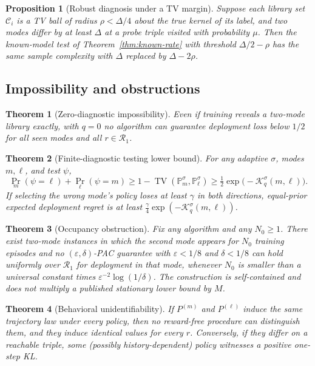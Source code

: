 \documentclass[11pt]{article}
\newtheorem{theorem}{Theorem}
\newtheorem{proposition}{Proposition}
\newcommand{\Rone}{\mathcal{R}_1}
\newcommand{\TV}{\operatorname{TV}}
\newcommand{\Prb}{\Pr}
\newcommand{\cC}{\mathcal{C}}
\newcommand{\eps}{\varepsilon}
\begin{document}
\begin{proposition}[Robust diagnosis under a TV margin]
\label{prop:robust}
Suppose each library set $\cC_i$ is a TV ball of radius $\rho<\Delta/4$ about
the true kernel of its label, and two modes differ by at least $\Delta$ at a
probe triple visited with probability $\mu$. Then the known-model test of
Theorem~\ref{thm:known-rate} with threshold $\Delta/2-\rho$ has the same
sample complexity with $\Delta$ replaced by $\Delta-2\rho$.
\end{proposition}

\subsection{Impossibility and obstructions}

\begin{theorem}[Zero-diagnostic impossibility]
\label{thm:zero}
Even if training reveals a two-mode library exactly, with $q=0$ no algorithm
can guarantee deployment loss below $1/2$ for all seen modes and all
$r\in\Rone$.
\end{theorem}

\begin{theorem}[Finite-diagnostic testing lower bound]
\label{thm:diag-lb}
For any adaptive $\sigma$, modes $m,\ell$, and test $\psi$,
\[
\Prb_m(\psi=\ell)+\Prb_\ell(\psi=m)
\ge 1-\TV(\mathbb{P}_m^\sigma,\mathbb{P}_\ell^\sigma)
\ge \tfrac12\exp\bigl(-\mathcal{K}_q^\sigma(m,\ell)\bigr).
\]
If selecting the wrong mode's policy loses at least $\gamma$ in both
directions, equal-prior expected deployment regret is at least
$\frac{\gamma}{4}\exp(-\mathcal{K}_q^\sigma(m,\ell))$.
\end{theorem}

\begin{theorem}[Occupancy obstruction]
\label{thm:occupancy}
Fix any algorithm and any $N_0\ge 1$. There exist two-mode instances in which
the second mode appears for $N_0$ training episodes and no $(\eps,\delta)$-PAC
guarantee with $\eps<1/8$ and $\delta<1/8$ can hold uniformly over $\Rone$ for
deployment in that mode, whenever $N_0$ is smaller than a universal constant
times $\eps^{-2}\log(1/\delta)$. The construction is self-contained and does
not multiply a published stationary lower bound by $M$.
\end{theorem}

\begin{theorem}[Behavioral unidentifiability]
\label{thm:behavior}
If $P^{(m)}$ and $P^{(\ell)}$ induce the same trajectory law under every
policy, then no reward-free procedure can distinguish them, and they induce
identical values for every $r$. Conversely, if they differ on a reachable
triple, some (possibly history-dependent) policy witnesses a positive
one-step KL.
\end{theorem}
\end{document}

